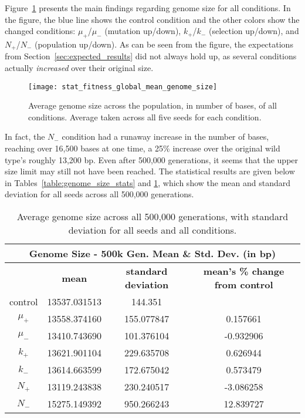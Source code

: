 Figure~\ref{fig:genome_size} presents the main findings regarding genome size for all conditions. In the figure, the blue line shows the control condition and the other colors show the changed conditions: $\mu_+$/$\mu_-$ (mutation up/down), $k_+$/$k_-$ (selection up/down), and $N_+$/$N_-$ (population up/down). As can be seen from the figure, the expectations from Section~\ref{sec:expected_results} did not always hold up, as several conditions actually \textit{increased} over their original size. 
\begin{figure}[H]
	\centering
	\texttt{[image: stat\_fitness\_global\_mean\_genome\_size]}
	\caption[Genome size]{Average genome size across the population, in number of bases, of all conditions. Average taken across all five seeds for each condition.}
	\label{fig:genome_size}
\end{figure}
In fact, the $N_-$ condition had a runaway increase in the number of bases, reaching over 16,500 bases at one time, a 25\% increase over the original wild type's roughly 13,200 bp. Even after 500,000 generations, it seems that the upper size limit may still not have been reached. The statistical results are given below in Tables~\ref{table:genome_size_stats} and \ref{table:genome_size_mean_and_std_dev}, which show the mean and standard deviation for all seeds across all 500,000 generations. 

\begin{table}[h]
	\begin{tabular}{|c|c|c|c|}
		\hline
		\multicolumn{4}{c}{\Large \textbf{Genome Size - 500k Gen. Mean \& Std. Dev. (in bp)}} \\
		\hline
		 & \textbf{mean} & \textbf{standard deviation} & \textbf{mean's \% change from control} \\
		 \hline
		 control & 13537.031513 & 144.351 & \textemdash \\ 
		 \hline
		 $\mu_+$ & 13558.374160 & 155.077847 & 0.157661 \\ 
		 \hline
		 $\mu_-$ & 13410.743690 & 101.376104 & -0.932906 \\ 
		 \hline
		 $k_+$ & 13621.901104 & 229.635708 & 0.626944 \\ 
		 \hline
		 $k_-$ & 13614.663599 & 172.675042 & 0.573479 \\ 
		 \hline
		 $N_+$ & 13119.243838 & 230.240517 & -3.086258 \\ 
		 \hline
		 $N_-$ & 15275.149392 & 950.266243 & 12.839727 \\ 
		 \hline
	\end{tabular}
	\caption[Genome size - mean and std. dev.]{Average genome size across all 500,000 generations, with standard deviation for all seeds and all conditions. }
	\label{table:genome_size_mean_and_std_dev}
\end{table}

